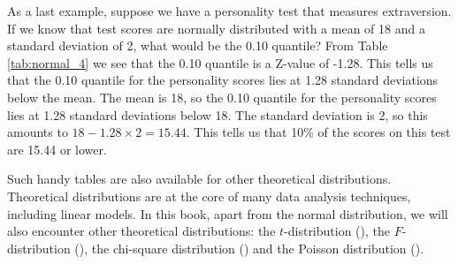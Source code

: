 \documentclass[]{report}\usepackage[]{graphicx}\usepackage[]{color}
\begin{document}
As a last example, suppose we have a personality test that measures extraversion. If we know that test scores are normally distributed with a mean of 18 and a standard deviation of 2, what would be the 0.10 quantile? From Table \ref{tab:normal_4} we see that the 0.10 quantile is a Z-value of -1.28. This tells us that the 0.10 quantile for the personality scores lies at 1.28 standard deviations below the mean. The mean is 18, so the 0.10 quantile for the personality scores lies at 1.28 standard deviations below 18. The standard deviation is 2, so this amounts to $18-1.28 \times 2= 15.44$. This tells us that 10\% of the scores on this test are 15.44 or lower.

Such handy tables are also available for other theoretical distributions. Theoretical distributions are at the core of many data analysis techniques, including linear models. In this book, apart from the normal distribution, we will also encounter other theoretical distributions: the $t$-distribution (), the $F$-distribution (), the chi-square distribution () and the Poisson distribution ().
\end{document}
